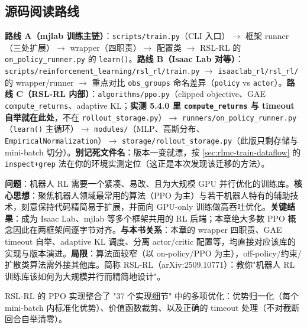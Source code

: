\subsection{源码阅读路线}

\textbf{路线 A（mjlab 训练主链）}：\verb|scripts/train.py|（CLI 入口）$\to$ 框架 runner（三处扩展）$\to$ wrapper（四职责）$\to$ 配置类 $\to$ RSL-RL 的 \verb|on_policy_runner.py| 的 \verb|learn()|。\textbf{路线 B（Isaac Lab 对等）}：\verb|scripts/reinforcement_learning/rsl_rl/train.py| $\to$ \verb|isaaclab_rl/rsl_rl/| 的 wrapper/runner $\to$ 重点对比 \verb|obs_groups| 命名差异（\verb|policy| vs \verb|actor|）。\textbf{路线 C（RSL-RL 内部）}：\verb|algorithms/ppo.py|（clipped objective、GAE \verb|compute_returns|、adaptive KL；\textbf{实测 5.4.0 里 \texttt{compute\_returns} 与 timeout 自举就在此处}，不在 \verb|rollout_storage.py|）$\to$ \verb|runners/on_policy_runner.py|（\verb|learn()| 主循环）$\to$ \verb|modules/|（MLP、高斯分布、\verb|EmpiricalNormalization|）$\to$ \verb|storage/rollout_storage.py|（此版只剩存储与 mini-batch 切分）。\textbf{别记死文件名}：版本一变就漂，按 \cref{sec:rlmc-train-dataflow} 的 \texttt{inspect+grep} 法在你的环境实测定位（这正是本次发现该迁移的方法）。

\begin{paper}\label{paper:rlmc-rslrl}
\textbf{问题}：机器人 RL 需要一个紧凑、易改、且为大规模 GPU 并行优化的训练库。\textbf{核心思想}：聚焦机器人领域最常用的算法（PPO 为主）与若干机器人特有的辅助技术，刻意保持代码精简易于扩展，并面向 GPU-only 训练做高吞吐优化。\textbf{关键结果}：成为 Isaac Lab、mjlab 等多个框架共用的 RL 后端；本章绝大多数 PPO 概念因此在两框架间逐字节对齐。\textbf{与本书关系}：本章的 wrapper 四职责、GAE timeout 自举、adaptive KL 调度、分离 actor/critic 配置等，均直接对应该库的实现与版本演进。\textbf{局限}：算法面较窄（以 on-policy/PPO 为主），off-policy/约束/扩散类算法需外接其他库。简称 RSL-RL（arXiv:2509.10771）\cite{schwarke2025rslrl}：教你"机器人 RL 训练库该如何为大规模并行而精简地设计"。
\end{paper}

RSL-RL 的 PPO 实现整合了 "37 个实现细节" \cite{huang2022ppo37} 中的多项优化：优势归一化（每个 mini-batch 内标准化优势）、价值函数裁剪、以及正确的 timeout 处理（不对截断回合自举清零）。

